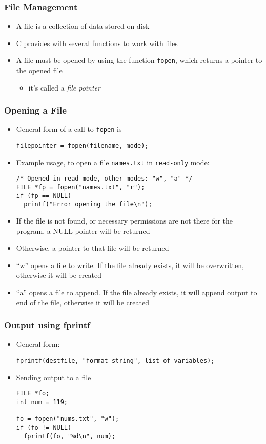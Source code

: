 \documentclass[11pt]{beamer}
\begin{document}
\begin{frame}[fragile]\frametitle{File Management}
\label{sec-1-12}

\begin{itemize}
\item A file is a collection of data stored on disk
\item C provides with several functions to work with files
\item A file must be opened by using the function \verb~fopen~, which returns a pointer to the opened file
\begin{itemize}
\item it's called a \emph{file pointer}
\end{itemize}
\end{itemize}
\end{frame}
\begin{frame}[fragile]\frametitle{Opening a File}
\label{sec-1-13}

\begin{itemize}
\item General form of a call to \verb~fopen~ is

\begin{verbatim}
filepointer = fopen(filename, mode);
\end{verbatim}
\item Example usage, to open a file \verb~names.txt~ in \verb~read-only~ mode:

\begin{verbatim}
/* Opened in read-mode, other modes: "w", "a" */
FILE *fp = fopen("names.txt", "r"); 
if (fp == NULL)
  printf("Error opening the file\n");
\end{verbatim}
\item If the file is not found, or necessary permissions are not there for the program, a NULL pointer will be returned
\item Otherwise, a pointer to that file will be returned
\item ``w'' opens a file to write. If the file already exists, it will be overwritten, otherwise it will be created
\item ``a'' opens a file to append. If the file already exists, it will append output to end of the file, otherwise it will be created
\end{itemize}
\end{frame}
\begin{frame}[fragile]\frametitle{Output using fprintf}
\label{sec-1-14}

\begin{itemize}
\item General form:

\begin{verbatim}
fprintf(destfile, "format string", list of variables);
\end{verbatim}
\item Sending output to a file

\begin{verbatim}
FILE *fo;
int num = 119;

fo = fopen("nums.txt", "w"); 
if (fo != NULL)
  fprintf(fo, "%d\n", num);
\end{verbatim}
\end{itemize}
\end{frame}
\end{document}
